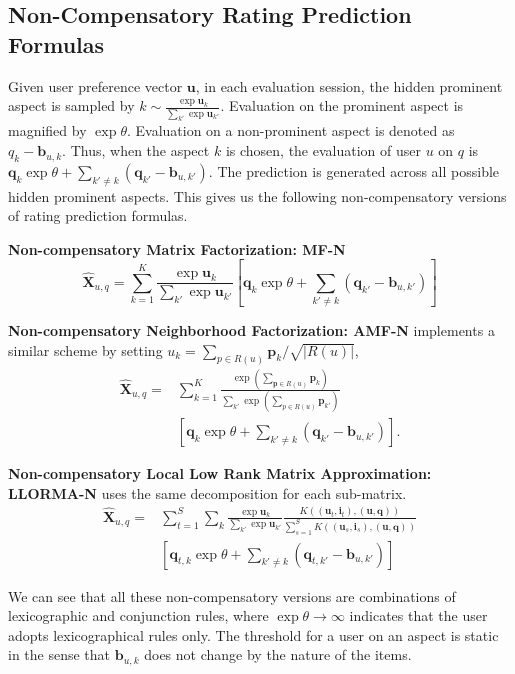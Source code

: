 \documentclass[letterpaper]{article} %
\newcommand{\Rating}{\mathbf{X}}
\begin{document}
\subsection{Non-Compensatory Rating Prediction Formulas}
Given user preference vector $\mathbf{u}$, in each evaluation session, the hidden prominent aspect is sampled by $k\sim \frac{\exp \mathbf{u}_k}{\sum_{k'} \exp \mathbf{u}_{k'}} $. Evaluation on the prominent aspect is magnified by  $\exp \theta$. Evaluation on a non-prominent aspect is denoted as $q_k-\mathbf{b}_{u,k}$. Thus, when the aspect $k$ is chosen, the evaluation of user $u$ on $q$ is $\mathbf{q}_k \exp\theta  + \sum_{k'\neq k} (\mathbf{q}_{k'}-\mathbf{b}_{u,k'})$. The prediction is generated across all possible hidden prominent aspects. This gives us the following non-compensatory versions of rating prediction formulas.

\textbf{Non-compensatory Matrix Factorization: MF-N} 
\begin{equation}\label{equ:MF-N}
 \hat{\mathbf{X}}_{u,q}=\sum_{k=1}^{K} \frac{\exp \mathbf{u}_k}{\sum_{k'} \exp \mathbf{u}_{k'}} [ \mathbf{q}_k  \exp\theta  + \sum_{k'\neq k} (\mathbf{q}_{k'}-\mathbf{b}_{u,k'}) ]
\end{equation}


\textbf{Non-compensatory Neighborhood Factorization: AMF-N} implements a similar scheme by setting $u_k =\sum_{p \in R(u)} \mathbf{p}_k/\sqrt{|R(u)|} $, 
\begin{eqnarray}\label{equ:AMF-N}
 \hat{\mathbf{X}}_{u,q}=&\sum_{k=1}^{K} \frac{\exp (\sum_{\mathbf{p} \in R(u)} \mathbf{p}_k )}{\sum_{k'} \exp  (\sum_{p \in R(u)} \mathbf{p}_{k'} ) } \\\nonumber
& [  \mathbf{q}_k \exp\theta + \sum_{k'\neq k} (\mathbf{q}_{k'}-\mathbf{b}_{u,k'}) ].
\end{eqnarray}

\textbf{Non-compensatory Local Low Rank Matrix Approximation: LLORMA-N} uses the same decomposition for each sub-matrix.  
\begin{eqnarray}\label{equ:LLORMA-N}
\hat{\Rating}_{u,q} = & \sum_{t=1}^{S} \sum_k  \frac{\exp \mathbf{u}_k}{\sum_{k'} \exp \mathbf{u}_{k'}}  \frac{K((\mathbf{u}_t,\mathbf{i}_t),(\mathbf{u},\mathbf{q}))}{\sum_{s=1}^{S} K((\mathbf{u}_s,\mathbf{i}_s),(\mathbf{u},\mathbf{q}))} \\\nonumber
& [ \mathbf{q}_{t,k} \exp\theta  + \sum_{k'\neq k} (\mathbf{q}_{t,k'}-\mathbf{b}_{u,k'}) ]
\end{eqnarray}

We can see that all these non-compensatory versions are combinations of lexicographic and conjunction rules, where  $\exp\theta \rightarrow \infty$ indicates that the user adopts lexicographical rules only. The threshold for a user on an aspect is static in the sense that $\mathbf{b}_{u,k}$ does not change by the nature of the items.
\end{document}
